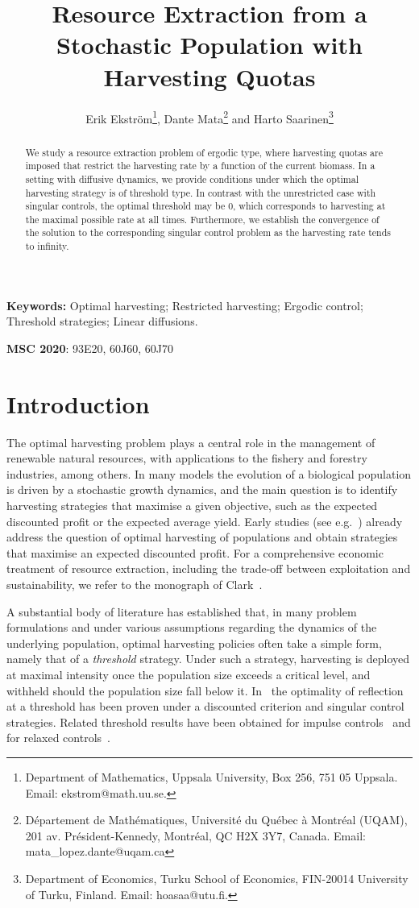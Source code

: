 \documentclass[12pt]{article}
\title{Resource Extraction from a Stochastic Population with Harvesting Quotas}
\author{
Erik Ekström\thanks{Department of Mathematics, Uppsala University, Box 256, 751 05 Uppsala. Email: ekstrom@math.uu.se.}, 
Dante Mata\thanks{D\'epartement de Math\'ematiques, Universit\'e du Qu\'ebec \`a Montr\'eal (UQAM), 201 av. Pr\'esident-Kennedy, Montr\'eal, QC H2X 3Y7, Canada. Email: mata\_lopez.dante@uqam.ca} 
and Harto Saarinen\thanks{Department of Economics, Turku School of Economics,
FIN-20014 University of Turku, Finland. Email: hoasaa@utu.fi.}}
\date{}
\begin{document}
\maketitle

\begin{abstract}
We study a resource extraction problem of ergodic type, where 
harvesting quotas are imposed that restrict the harvesting rate by a function of the current biomass. In a setting with diffusive dynamics, we provide conditions under which the optimal harvesting strategy is of threshold type. In contrast with the unrestricted case with singular controls, the optimal threshold may be 0, which corresponds to harvesting at the maximal possible rate at all times. Furthermore, we establish the convergence of the solution to the corresponding singular control problem as the harvesting rate tends to infinity.
\end{abstract}

\noindent
\textbf{Keywords:} Optimal harvesting; Restricted harvesting; Ergodic control; Threshold strategies; Linear diffusions.

\noindent
\textbf{MSC 2020}: 93E20, 60J60, 60J70 


\section{Introduction}

The optimal harvesting problem plays a central role in the management of renewable natural resources, with applications to the fishery and forestry industries, among others. In many models 
the evolution of a biological population is driven by a stochastic growth dynamics, and the main question is to identify harvesting strategies that maximise a given objective, such as the expected discounted profit or the  expected average yield. Early studies (see e.g.~\cite{Gleit1978, Ludwig1980}) already address the question of optimal harvesting of populations and obtain  strategies that maximise an expected discounted profit. 
For a comprehensive economic treatment of resource extraction, including the trade-off between exploitation and sustainability, we refer to the monograph of Clark~\cite{Clark1976}.

A substantial body of literature has established that, in many problem formulations and under various assumptions regarding the dynamics of the underlying population, optimal harvesting policies often take a simple form, namely that of a {\em threshold} strategy. 
Under such a strategy, harvesting is deployed at maximal intensity once the population size exceeds a critical level, and withheld should the population size fall below it. In~\cite{Alvarez1998, Lungu1997} the optimality of reflection at a threshold has been proven under a discounted criterion and singular control strategies. Related threshold results have been obtained for impulse controls~\cite{LiuZervos2025} and for relaxed controls~\cite{Stockbridge2013}.
\end{document}

